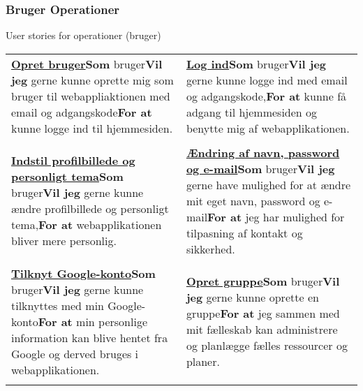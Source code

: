 \subsubsection{Bruger Operationer}

\noindent User stories for operationer (bruger)\newline

\begin{tabular}{p{2.5in}p{2.5in}}
\textbf{\underline{Opret bruger}}\newline \textbf{Som} bruger\newline \textbf{Vil jeg} gerne kunne oprette mig som bruger til webappliaktionen med email og adgangskode\newline \textbf{For at} kunne logge ind til hjemmesiden. &

\textbf{\underline{Log ind}}\newline \textbf{Som} bruger\newline \textbf{Vil jeg} gerne kunne logge ind med email og adgangskode,\newline \textbf{For at} kunne få adgang til hjemmesiden og benytte mig af webapplikationen.  \\\\

\textbf{\underline{Indstil profilbillede og personligt tema}}\newline \textbf{Som} bruger\newline \textbf{Vil jeg} gerne kunne ændre profilbillede og personligt tema,\newline \textbf{For at} webapplikationen bliver mere personlig.  &  

\textbf{\underline{Ændring af navn, password og e-mail}}\newline \textbf{Som} bruger\newline \textbf{Vil jeg} gerne have mulighed for at ændre mit eget navn, password og e-mail\newline \textbf{For at} jeg har mulighed for tilpasning af kontakt og sikkerhed.  \\\\

\textbf{\underline{Tilknyt Google-konto}}\newline \textbf{Som} bruger\newline \textbf{Vil jeg} gerne kunne tilknyttes med min Google-konto\newline \textbf{For at} min personlige information kan blive hentet fra Google og derved bruges i webapplikationen.  &

\textbf{\underline{Opret gruppe}}\newline \textbf{Som} bruger\newline \textbf{Vil jeg} gerne kunne oprette en gruppe\newline \textbf{For at} jeg sammen med mit fælleskab kan administrere og planlægge fælles ressourcer og planer. \\\\
\end{tabular}


